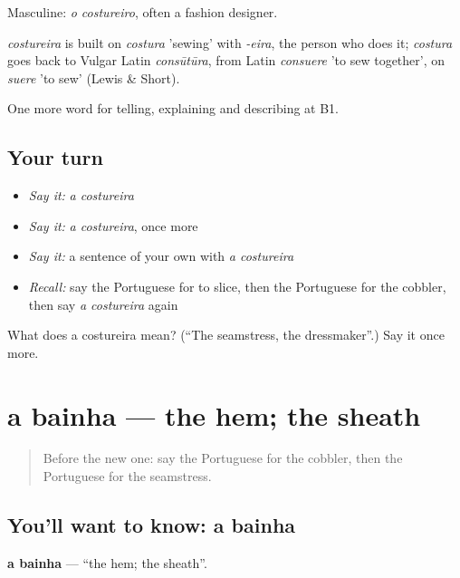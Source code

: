 Masculine: \emph{o costureiro}, often a fashion designer.

\begin{cousinweb}
\emph{costureira} is built on \emph{costura} 'sewing' with \emph{-eira}, the person who does it; \emph{costura} goes back to Vulgar Latin \emph{consūtūra}, from Latin \emph{consuere} 'to sew together', on \emph{suere} 'to sew' (Lewis \& Short).
\end{cousinweb}

\begin{grammarlens}[title={What you've built}]
One more word for telling, explaining and describing at B1.
\end{grammarlens}

\subsection*{Your turn}
\begin{itemize}
\raggedright
  \item \emph{Say it:} \emph{a costureira}
  \item \emph{Say it:} \emph{a costureira}, once more
  \item \emph{Say it:} a sentence of your own with \emph{a costureira}
  \item \emph{Recall:} say the Portuguese for to slice, then the Portuguese for the cobbler, then say \emph{a costureira} again
\end{itemize}

\begin{tcolorbox}[breakable,colback=teal!4,colframe=teal!35!black,title={Before you move on}]
What does a costureira mean? (\textquotedblleft{}The seamstress, the dressmaker\textquotedblright{}.) Say it once more.
\end{tcolorbox}
\section[a bainha]{a bainha — the hem; the sheath}

\label{lesson:PT-C451-bainha}



\begin{quote}
Before the new one: say the Portuguese for the cobbler, then the Portuguese for the seamstress.
\end{quote}

\subsection*{You'll want to know: a bainha}
\textbf{a bainha} — \textquotedblleft{}the hem; the sheath\textquotedblright{}.

